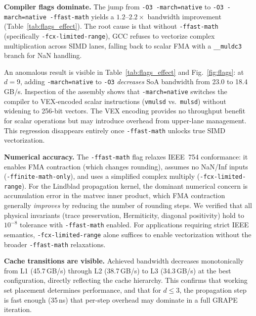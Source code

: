\documentclass[final,3p,times,twocolumn]{elsarticle}
\begin{document}
\textbf{Compiler flags dominate.}
The jump from \texttt{-O3 -march=native} to \texttt{-O3 -march=native
-ffast-math} yields a $1.2$--$2.2\times$ bandwidth improvement
(Table~\ref{tab:flags_effect}). The root cause is that without
\texttt{-ffast-math} (specifically \texttt{-fcx-limited-range}), GCC
refuses to vectorize complex multiplication across SIMD lanes, falling
back to scalar FMA with a \texttt{\_\_muldc3} branch for NaN handling.

An anomalous result is visible in Table~\ref{tab:flags_effect} and
Fig.~\ref{fig:flags}: at $d = 9$, adding \texttt{-march=native} to
\texttt{-O3} \emph{decreases} SoA bandwidth from 23.0 to 18.4\,GB/s.
Inspection of the assembly shows that \texttt{-march=native} switches the
compiler to VEX-encoded scalar instructions (\texttt{vmulsd} vs.\
\texttt{mulsd}) without widening to 256-bit vectors. The VEX encoding
provides no throughput benefit for scalar operations but may introduce
overhead from upper-lane management. This regression disappears entirely
once \texttt{-ffast-math} unlocks true SIMD vectorization.

\textbf{Numerical accuracy.}
The \texttt{-ffast-math} flag relaxes IEEE~754 conformance: it enables
FMA contraction (which changes rounding), assumes no NaN/Inf inputs
(\texttt{-ffinite-math-only}), and uses a simplified complex multiply
(\texttt{-fcx-limited-range}). For the Lindblad propagation kernel, the
dominant numerical concern is accumulation error in the matvec inner
product, which FMA contraction generally \emph{improves} by reducing the
number of rounding steps. We verified that all physical invariants
(trace preservation, Hermiticity, diagonal positivity) hold to $10^{-8}$
tolerance with \texttt{-ffast-math} enabled. For applications requiring
strict IEEE semantics, \texttt{-fcx-limited-range} alone suffices to
enable vectorization without the broader \texttt{-ffast-math} relaxations.

\textbf{Cache transitions are visible.}
Achieved bandwidth decreases monotonically from L1 (45.7\,GB/s) through
L2 (38.7\,GB/s) to L3 (34.3\,GB/s) at the best configuration, directly
reflecting the cache hierarchy. This confirms that working set placement
determines performance, and that for $d \leq 3$, the propagation step is
fast enough (35\,ns) that per-step overhead may dominate in a full GRAPE
iteration.
\end{document}
